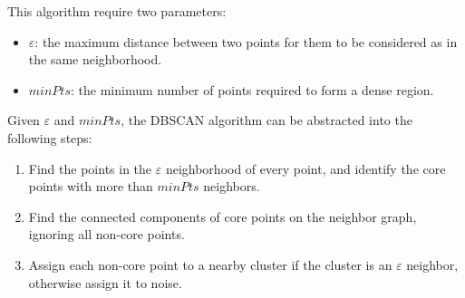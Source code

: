 This algorithm require two parameters:
\begin{itemize}
    \item $\varepsilon$: the maximum distance between two points for them to be considered as in the same neighborhood.
    \item $minPts$: the minimum number of points required to form a dense region.
\end{itemize}

Given $\varepsilon$ and $minPts$, the DBSCAN algorithm can be abstracted into the following steps:
\begin{enumerate}
    \item Find the points in the $\varepsilon$ neighborhood of every point, and identify the core points with more than $minPts$ neighbors.
    \item Find the connected components of core points on the neighbor graph, ignoring all non-core points.
    \item Assign each non-core point to a nearby cluster if the cluster is an  $\varepsilon$ neighbor, otherwise assign it to noise.
\end{enumerate}